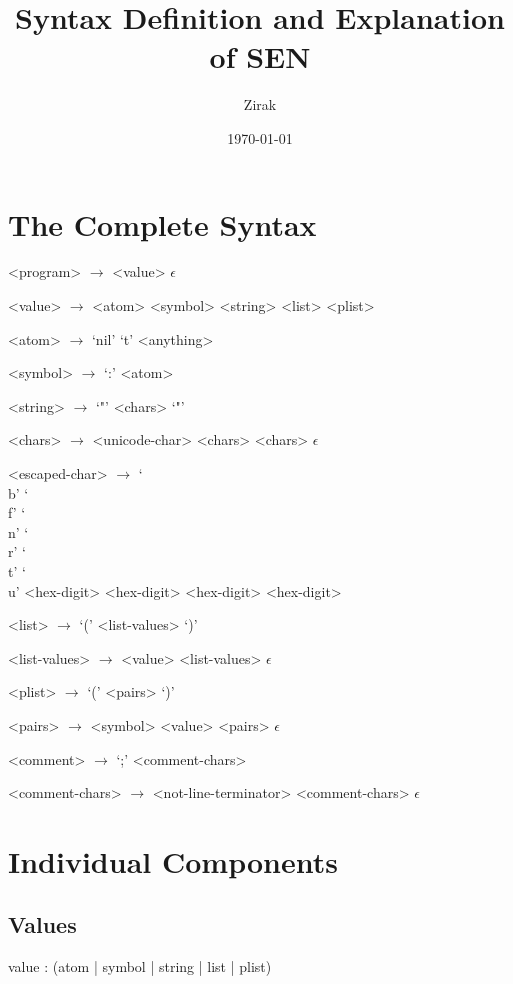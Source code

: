 \documentclass[a4paper]{article}
\begin{document}
\title{Syntax Definition and Explanation of SEN}
\author{Zirak}
\date{\today}

\maketitle

\tableofcontents

\section{The Complete Syntax}

\begin{grammar}
	<program> $\to$ <value>
		\alt $\epsilon$

	<value> $\to$ <atom>
		\alt <symbol>
		\alt <string>
		\alt <plist>

	<atom> $\to$ `nil'
		\alt `t'
		\alt <anything>

	<symbol> $\to$ `:' <atom>

	<string> $\to$ `"' <chars> `"'

	<chars> $\to$ <unicode-char> <chars>
		\alt <escaped-char> <chars>
		\alt $\epsilon$

	<escaped-char> $\to$ `\\b'
		\alt `\\f'
		\alt `\\n'
		\alt `\\r'
		\alt `\\t'
		\alt `\\u' <hex-digit> <hex-digit> <hex-digit> <hex-digit>

	<list> $\to$ `(' <list-values> `)'

	<list-values> $\to$ <value> <list-values>
		\alt $\epsilon$

	<plist> $\to$ `(' <pairs> `)'

	<pairs> $\to$ <symbol> <value> <pairs>
		\alt $\epsilon$

	<comment> $\to$ `;' <comment-chars>

	<comment-chars> $\to$ <not-line-terminator> <comment-chars>
		\alt $\epsilon$
\end{grammar}

\section{Individual Components}

\subsection{Values}
\begin{rail}
	value : (atom | symbol | string | list | plist)
\end{rail}
\end{document}
